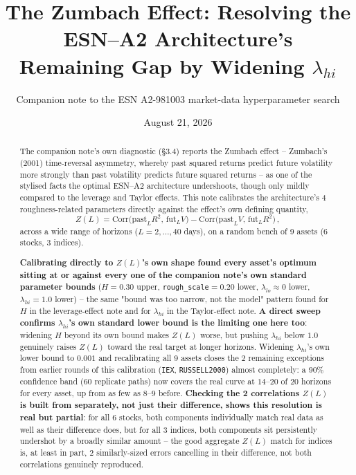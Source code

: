 \documentclass[11pt]{article}
\title{The Zumbach Effect: Resolving the ESN--A2 Architecture's\\
Remaining Gap by Widening $\lambda_{hi}$}
\author{Companion note to the ESN A2-981003 market-data hyperparameter search}
\date{August 21, 2026}
\begin{document}
\maketitle

\begin{abstract}
The companion note's own diagnostic (\S3.4) reports the Zumbach effect --
Zumbach's (2001) time-reversal asymmetry, whereby past squared returns
predict future volatility more strongly than past volatility predicts future
squared returns -- as one of the stylised facts the optimal ESN--A2
architecture undershoots, though only mildly compared to the leverage and
Taylor effects. This note calibrates the architecture's 4 roughness-related
parameters directly against the effect's own defining quantity,
\begin{equation}
Z(L) = \text{Corr}\big(\text{past}_L R^2,\,\text{fut}_L V\big) -
\text{Corr}\big(\text{past}_L V,\,\text{fut}_L R^2\big)\, ,
\label{eq:zumbach_scalar}
\end{equation}
across a wide range of horizons ($L=2,\dots,40$ days), on a random bench of 9
assets (6 stocks, 3 indices).

\textbf{Calibrating directly to $Z(L)$'s own shape found every asset's optimum
sitting at or against every one of the companion note's own standard
parameter bounds} ($H=0.30$ upper, \texttt{rough\_scale}$=0.20$ lower,
$\lambda_{lo}\approx0$ lower, $\lambda_{hi}=1.0$ lower) -- the same
"bound was too narrow, not the model" pattern found for $H$ in the
leverage-effect note and for $\lambda_{hi}$ in the Taylor-effect note.
\textbf{A direct sweep confirms $\lambda_{hi}$'s own standard lower bound is
the limiting one here too}: widening $H$ beyond its own bound makes $Z(L)$
worse, but pushing $\lambda_{hi}$ below $1.0$ genuinely raises $Z(L)$ toward
the real target at longer horizons. Widening $\lambda_{hi}$'s own lower bound
to $0.001$ and recalibrating all 9 assets closes the 2 remaining exceptions
from earlier rounds of this calibration (\texttt{IEX}, \texttt{RUSSELL2000})
almost completely: a $90\%$ confidence band (60 replicate paths) now covers
the real curve at $14$--$20$ of $20$ horizons for every asset, up from as few
as $8$--$9$ before. \textbf{Checking the 2 correlations $Z(L)$ is built from
separately, not just their difference, shows this resolution is real but
partial}: for all 6 stocks, both components individually match real data as
well as their difference does, but for all 3 indices, both components sit
persistently undershot by a broadly similar amount -- the good aggregate
$Z(L)$ match for indices is, at least in part, 2 similarly-sized errors
cancelling in their difference, not both correlations genuinely reproduced.
\end{abstract}
\end{document}
